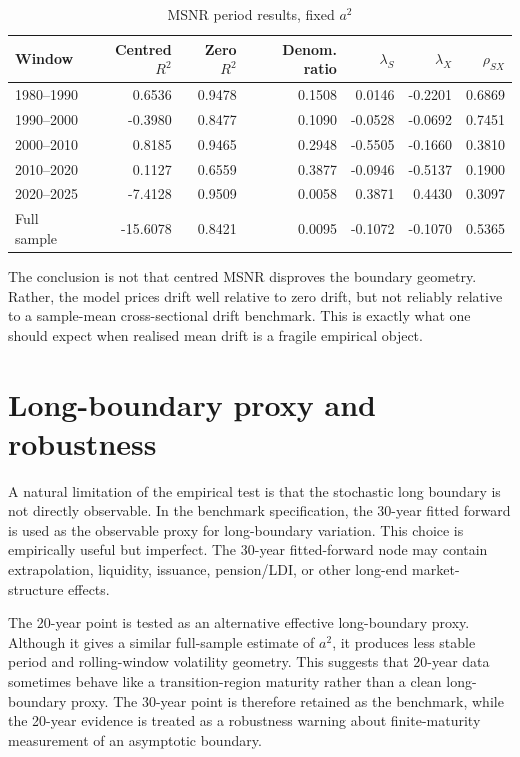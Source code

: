 \documentclass[11pt]{article}
\numberwithin{equation}{section}
\begin{document}
\begin{table}[htbp]\centering\caption{MSNR period results, fixed $a^2$}\label{tab:msnrperiods}\begin{tabular}{lrrrrrr}\toprule
Window&Centred $R^2$&Zero $R^2$&Denom. ratio&$\lambda_S$&$\lambda_X$&$\rho_{SX}$\\\midrule
1980--1990&0.6536&0.9478&0.1508&0.0146&-0.2201&0.6869\\
1990--2000&-0.3980&0.8477&0.1090&-0.0528&-0.0692&0.7451\\
2000--2010&0.8185&0.9465&0.2948&-0.5505&-0.1660&0.3810\\
2010--2020&0.1127&0.6559&0.3877&-0.0946&-0.5137&0.1900\\
2020--2025&-7.4128&0.9509&0.0058&0.3871&0.4430&0.3097\\
Full sample&-15.6078&0.8421&0.0095&-0.1072&-0.1070&0.5365\\\bottomrule\end{tabular}\end{table}

The conclusion is not that centred MSNR disproves the boundary geometry. Rather, the model prices drift well relative to zero drift, but not reliably relative to a sample-mean cross-sectional drift benchmark. This is exactly what one should expect when realised mean drift is a fragile empirical object.

\section{Long-boundary proxy and robustness}
A natural limitation of the empirical test is that the stochastic long boundary is not directly observable. In the benchmark specification, the 30-year fitted forward is used as the observable proxy for long-boundary variation. This choice is empirically useful but imperfect. The 30-year fitted-forward node may contain extrapolation, liquidity, issuance, pension/LDI, or other long-end market-structure effects.

The 20-year point is tested as an alternative effective long-boundary proxy. Although it gives a similar full-sample estimate of $a^2$, it produces less stable period and rolling-window volatility geometry. This suggests that 20-year data sometimes behave like a transition-region maturity rather than a clean long-boundary proxy. The 30-year point is therefore retained as the benchmark, while the 20-year evidence is treated as a robustness warning about finite-maturity measurement of an asymptotic boundary.
\end{document}
